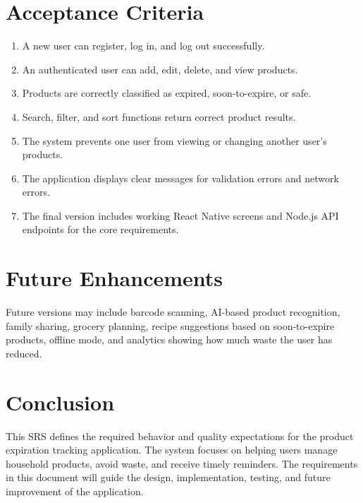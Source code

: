 \documentclass[12pt]{article}
\begin{document}
\section{Acceptance Criteria}
\begin{enumerate}
    \item A new user can register, log in, and log out successfully.
    \item An authenticated user can add, edit, delete, and view products.
    \item Products are correctly classified as expired, soon-to-expire, or safe.
    \item Search, filter, and sort functions return correct product results.
    \item The system prevents one user from viewing or changing another user's products.
    \item The application displays clear messages for validation errors and network errors.
    \item The final version includes working React Native screens and Node.js API endpoints for the core requirements.
\end{enumerate}

\section{Future Enhancements}
Future versions may include barcode scanning, AI-based product recognition, family sharing, grocery planning, recipe suggestions based on soon-to-expire products, offline mode, and analytics showing how much waste the user has reduced.

\section{Conclusion}
This SRS defines the required behavior and quality expectations for the product expiration tracking application. The system focuses on helping users manage household products, avoid waste, and receive timely reminders. The requirements in this document will guide the design, implementation, testing, and future improvement of the application.
\end{document}
